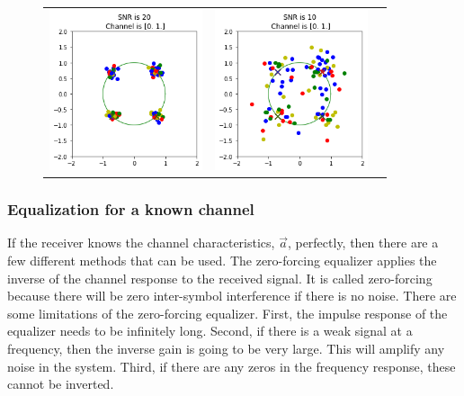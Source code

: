 \begin{figure}
\begin{tabular}{ccc}
    \includegraphics[width=45mm]{figures/equal_intro/snr_20_c5/cfo_0.png}&
    \includegraphics[width=45mm]{figures/equal_intro/snr_10_c5/cfo_0.png}\\
  \end{tabular}
  \label{fig:multi_tap}
\end{figure}

\subsubsection{Equalization for a known channel}

If the receiver knows the channel characteristics, $\vec{a}$, perfectly, then there are a few different methods that can be used.  
The zero-forcing equalizer applies the inverse of the channel response to the received signal.  It is called zero-forcing because there will be zero inter-symbol interference if there is no noise.
There are some limitations of the zero-forcing equalizer. 
First, the impulse response of the equalizer needs to be infinitely long. 
Second, if there is a weak signal at a frequency, then the inverse gain is going to be very large.  This will amplify any noise in the system. 
Third, if there are any zeros in the frequency response, these cannot be inverted.

